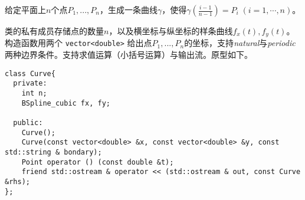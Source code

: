 \documentclass[lang=cn,11pt,a4paper]{elegantpaper}
\begin{document}
给定平面上$n$个点$P_1,...,P_n$，生成一条曲线$\gamma$，使得$\gamma\left(\frac{i-1}{n-1}\right)=P_i\;(i=1,\cdots,n)$。

类的私有成员存储点的数量$n$，以及横坐标与纵坐标的样条曲线$f_x(t),f_y(t)$。构造函数用两个 \verb|vector<double>| 给出点$P_1,...,P_n$的坐标，支持\textit{natural}与\textit{periodic}两种边界条件。支持求值运算（小括号运算）与输出流。原型如下。

\begin{lstlisting}
class Curve{
  private:
    int n;
    BSpline_cubic fx, fy;
  
  public:
    Curve();
    Curve(const vector<double> &x, const vector<double> &y, const std::string & bondary);
    Point operator () (const double &t);
    friend std::ostream & operator << (std::ostream & out, const Curve &rhs);
};
\end{lstlisting}
\end{document}
